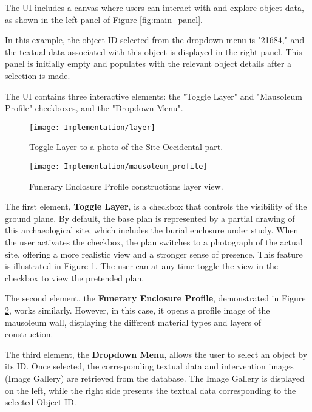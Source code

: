 The \gls{UI} includes a canvas where users can interact with and explore object data, as shown in the left panel of Figure \ref{fig:main_panel}. 

In this example, the object \gls{ID} selected from the dropdown menu is "21684," and the textual data associated with this object is displayed in the right panel. 
This panel is initially empty and populates with the relevant object details after a selection is made. 

The \gls{UI} contains three interactive elements: the "Toggle Layer" and "Mausoleum Profile" checkboxes, and the "Dropdown Menu".

 \begin{figure}[h!]
    \centering
    \texttt{[image: Implementation/layer]}
    \caption{Toggle Layer to a photo of the Site Occidental part.}
    \label{fig:toggle_layer}    
\end{figure}


 \begin{figure}[h!]
    \centering
    \texttt{[image: Implementation/mausoleum\_profile]}
    \caption{Funerary Enclosure Profile constructions layer view.}
    \label{fig:mausoleum_profile}    
\end{figure}

The first element, \textbf{Toggle Layer}, is a checkbox that controls the visibility of the ground plane.
By default, the base plan is represented by a partial drawing of this archaeological site, which includes the burial enclosure under study. 
When the user activates the checkbox, the plan switches to a photograph of the actual site, offering a more realistic view and a stronger sense of presence. 
This feature is illustrated in Figure \ref{fig:toggle_layer}.
The user can at any time toggle the view in the checkbox to view the pretended plan.

The second element, the \textbf{Funerary Enclosure Profile}, demonstrated in Figure \ref{fig:mausoleum_profile}, works similarly. However, in this case, it opens a profile image of the mausoleum wall, displaying the different material types and layers of construction.

The third element, the \textbf{Dropdown Menu}, allows the user to select an object by its \gls{ID}.
Once selected, the corresponding textual data and intervention images (Image Gallery) are retrieved from the database.
The Image Gallery is displayed on the left, while the right side presents the textual data corresponding to the selected Object \gls{ID}.

